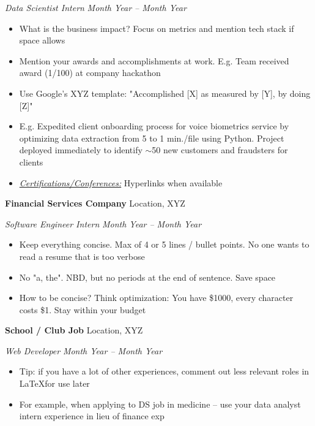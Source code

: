 \documentclass[letterpaper,10pt]{article}
\begin{document}
    \textit { Data Scientist Intern} \hfill \textit {Month Year -- Month Year}
    \begin{itemize}[noitemsep, nolistsep]
    \renewcommand\labelitemi{\scriptsize$\bullet$}

        \item What is the business impact? Focus on metrics and mention tech stack if space allows
        \item Mention your awards and accomplishments at work. E.g. Team received award (1/100) at company hackathon
        \item Use Google's XYZ template: "Accomplished [X] as measured by [Y], by doing [Z]"
        \item E.g. Expedited client onboarding process for voice biometrics service by optimizing data extraction from 5 to 1 min./file using Python. Project deployed immediately to identify $\sim$50 new customers and fraudsters for clients
        \item \textit {\underline{Certifications/Conferences:}} Hyperlinks when available %
        
    \end{itemize}
    
    \vspace{2.25mm}

    \textbf {Financial Services Company} \hfill Location, XYZ
    
    \textit { Software Engineer Intern} \hfill \textit {Month Year -- Month Year}
    \begin{itemize}[noitemsep, nolistsep]
    \renewcommand\labelitemi{\scriptsize$\bullet$}
        \item Keep everything concise. Max of 4 or 5 lines / bullet points. No one wants to read a resume that is too verbose 
        \item No "a, the". NBD, but no periods at the end of sentence. Save space
        \item How to be concise? Think optimization: You have \$1000, every character costs \$1. Stay within your budget
    \end{itemize}

    \vspace{2.25mm}
    
    \textbf {School / Club Job} \hfill Location, XYZ
    
    \textit { Web Developer}
    \hfill \textit {Month Year -- Month Year}
    \begin{itemize}[noitemsep, nolistsep]
    \renewcommand\labelitemi{\scriptsize$\bullet$}
        \item Tip: if you have a lot of other experiences, comment out less relevant roles in \LaTeX for use later
        \item For example, when applying to DS job in medicine -- use your data analyst intern experience in lieu of finance exp
    \end{itemize}
    
\end{document}
